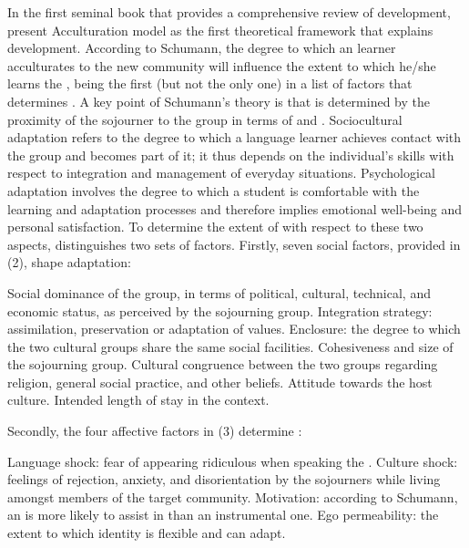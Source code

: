 \documentclass[output=paper]{langsci/langscibook}
\begin{document}
In the first seminal book that provides a comprehensive review of   development, \citet{KasperRose2002} present  Acculturation model as the first theoretical framework that explains  development. According to Schumann, the degree to which an  learner acculturates to the new  community will influence the extent to which he/she learns the ,  being the first (but not the only one) in a list of factors that determines  . A key point of Schumann’s theory is that  is determined by the proximity of the sojourner to the  group in terms of  and . Sociocultural adaptation refers to the degree to which a language learner achieves contact with the  group and becomes part of it; it thus depends on the individual’s skills with respect to integration and management of everyday situations. Psychological adaptation involves the degree to which a student is comfortable with the learning and adaptation processes and therefore implies emotional well-being and personal satisfaction. To determine the extent of  with respect to these two aspects, \citet{Schumann1986} distinguishes two sets of factors. Firstly, seven social factors, provided in (2), shape  adaptation: 

\ea%
\ea Social dominance of the  group, in terms of political, cultural, technical, and economic status, as perceived by the sojourning group.
\ex Integration strategy: assimilation, preservation or adaptation of  values.
\ex Enclosure: the degree to which the two cultural groups share the same social facilities.
\ex Cohesiveness and size of the sojourning group.
\ex Cultural congruence between the two groups regarding religion, general social practice, and other beliefs.
\ex Attitude towards the host culture.
\ex Intended length of stay in the  context.
\z
\z

Secondly, the four affective factors in (3) determine : 

\ea%
\ea  Language shock: fear of appearing ridiculous when speaking the .
\ex Culture shock: feelings of rejection, anxiety, and disorientation by the sojourners while living amongst members of the target community.
\ex Motivation: according to Schumann, an  is more likely to assist in  than an instrumental one. 
\ex Ego permeability: the extent to which identity is flexible and can adapt.
\z
\z
\end{document}
